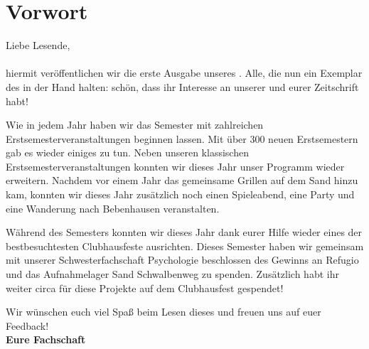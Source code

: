 \section{Vorwort}
\Large
Liebe Lesende,\\
\\
\normalsize
hiermit veröffentlichen wir die erste Ausgabe unseres \nameit. Alle, die nun ein Exemplar des \nameit \space in der Hand halten: schön, dass ihr Interesse an unserer und eurer Zeitschrift habt! 

Wie in jedem Jahr haben wir das Semester mit zahlreichen Erstsemesterveranstaltungen beginnen lassen. Mit über 300 neuen Erstsemestern gab es wieder einiges zu tun.
Neben unseren klassischen Erstsemesterveranstaltungen konnten wir dieses Jahr unser Programm wieder erweitern. Nachdem vor einem Jahr das gemeinsame Grillen auf dem Sand hinzu kam, konnten wir dieses Jahr zusätzlich noch einen Spieleabend, eine Party und eine Wanderung nach Bebenhausen veranstalten.

Während des Semesters konnten wir dieses Jahr dank eurer Hilfe wieder eines der bestbesuchtesten Clubhausfeste ausrichten. Dieses Semester haben wir gemeinsam mit unserer Schwesterfachschaft Psychologie beschlossen  des Gewinns an Refugio und das Aufnahmelager Sand Schwalbenweg zu spenden. Zusätzlich habt ihr weiter circa  für diese Projekte auf dem Clubhausfest gespendet! 

Wir wünschen euch viel Spaß beim Lesen dieses \nameit \space und freuen uns auf euer Feedback!\\

\large
\textbf{Eure Fachschaft}
\normalsize